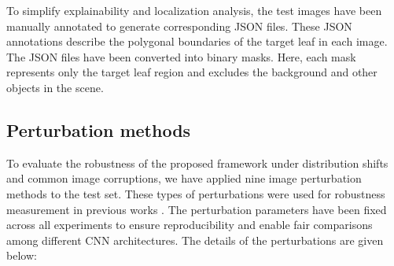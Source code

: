\documentclass[a4paper,fleqn]{cas-dc}
\begin{document}
	To simplify explainability and localization analysis, the test images have been manually annotated to generate corresponding JSON files. 
	These JSON annotations describe the polygonal boundaries of the target leaf in each image. 
	The JSON files have been converted into binary masks. 
	Here, each mask represents only the target leaf region and excludes the background and other objects in the scene. 
	
	


	\subsection{Perturbation methods}
	\label{sec:perturbation_methods}
	To evaluate the robustness of the proposed framework under distribution shifts and common image corruptions, we have applied nine image perturbation methods to the test set. These types of perturbations were used for robustness measurement in previous works \cite{ref16, r34}.
	The perturbation parameters have been fixed across all experiments to ensure reproducibility and enable fair comparisons among different CNN architectures. 
	The details of the perturbations are given below: 
	
\end{document}
